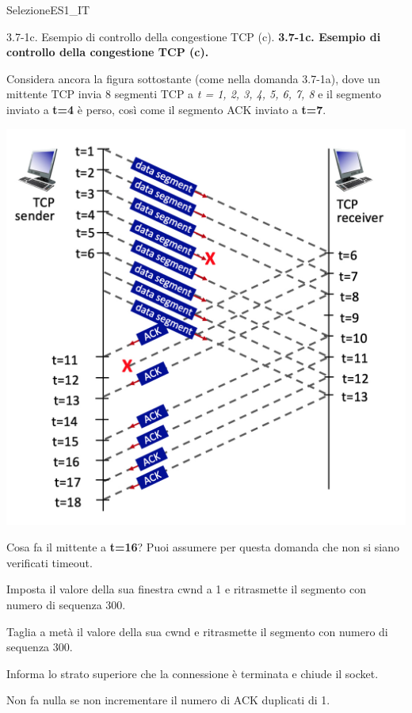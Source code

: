 \documentclass[a4paper]{article}
\begin{document}
\begin{quiz}{SelezioneES1\_IT}
\begin{multi}[points=1,shuffle]{3.7-1c. Esempio di controllo della congestione TCP (c).}
\textbf{3.7-1c. Esempio di controllo della congestione TCP (c).}

Considera ancora la figura sottostante (come nella domanda 3.7-1a), dove un mittente TCP invia 8 segmenti TCP a \emph{t = 1, 2, 3, 4, 5, 6, 7, 8} e il segmento inviato a \textbf{t=4} è perso, così come il segmento ACK inviato a \textbf{t=7}.

\begin{center}
	\includegraphics[width=\linewidth]{figs/tcp_seq_ack_1.jpg}
\end{center}

Cosa fa il mittente a \textbf{t=16}? Puoi assumere per questa domanda che non si siano verificati timeout.
\item Imposta il valore della sua finestra cwnd a 1 e ritrasmette il segmento con numero di sequenza 300.
\item Taglia a metà il valore della sua cwnd e ritrasmette il segmento con numero di sequenza 300.
\item Informa lo strato superiore che la connessione è terminata e chiude il socket.
\item* Non fa nulla se non incrementare il numero di ACK duplicati di 1.
\end{multi}


\end{quiz}
\end{document}
